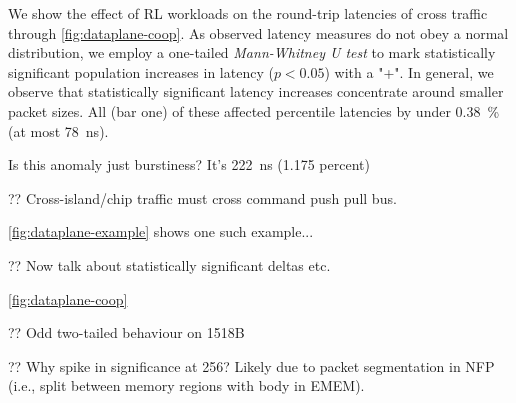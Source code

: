 \documentclass[sigconf,natbib=false]{acmart}
\begin{document}
We show the effect of RL workloads on the round-trip latencies of cross traffic through \cref{fig:dataplane-coop}.
As observed latency measures do not obey a normal distribution, we employ a one-tailed \emph{Mann-Whitney U test} to mark statistically significant population increases in latency ($p < 0.05$) with a "+".
In general, we observe that statistically significant latency increases concentrate around smaller packet sizes.
All (bar one) of these affected  percentile latencies by under \SI{0.38}{\percent} (at most \SI{78}{\nano\second}).


Is this anomaly just burstiness? It's \SI{222}{\nano\second} (1.175 percent)

?? Cross-island/chip traffic must cross command push pull bus.

\cref{fig:dataplane-example} shows one such example...

?? Now talk about statistically significant deltas etc.

\cref{fig:dataplane-coop}

?? Odd two-tailed behaviour on 1518B

?? Why spike in significance at 256? Likely due to packet segmentation in NFP (i.e., split between memory regions with body in EMEM).
\end{document}
